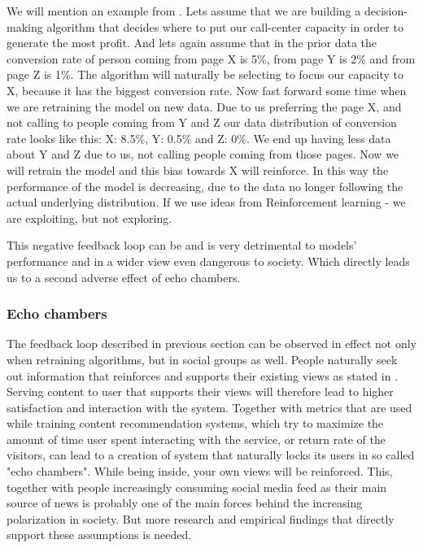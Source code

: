 We will mention an example from \cite{towardsdatascience_negative_feedback_loop}. Lets assume that we are building a decision-making algorithm that decides where to put our call-center capacity in order to generate the most profit. And lets again assume that in the prior data the conversion rate of person coming from page X is 5\%, from page Y is 2\% and from page Z is 1\%. The algorithm will naturally be selecting to focus our capacity to X, because it has the biggest conversion rate. Now fast forward some time when we are retraining the model on new data. Due to us preferring the page X, and not calling to people coming from Y and Z our data distribution of conversion rate looks like this: X: 8.5\%, Y: 0.5\% and Z: 0\%. We end up having less data about Y and Z due to us, not calling people coming from those pages. Now we will retrain the model and this bias towards X will reinforce. In this way the performance of the model is decreasing, due to the data no longer following the actual underlying distribution. If we use ideas from Reinforcement learning - we are exploiting, but not exploring.

This negative feedback loop can be and is very detrimental to models' performance and in a wider view even dangerous to society. Which directly leads us to a second adverse effect of echo chambers.

\subsubsection{Echo chambers}
The feedback loop described in previous section can be observed in effect not only when retraining algorithms, but in social groups as well. People naturally seek out information that reinforces and supports their existing views as stated in \cite{garrett2009_reinforcing_opinion}. Serving content to user that supports their views will therefore lead to higher satisfaction and interaction with the system. Together with metrics that are used while training content recommendation systems, which try to maximize the amount of time user spent interacting with the service, or return rate of the visitors, can lead to a creation of system that naturally locks its users in so called "echo chambers". While being inside, your own views will be reinforced. This, together with people increasingly consuming social media feed as their main source of news is probably one of the main forces behind the increasing polarization in society. But more research and empirical findings that directly support these assumptions is needed.









